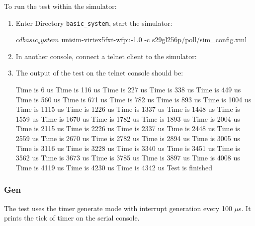 \noindent To run the test within the simulator:
\begin{enumerate}
\item Enter Directory \texttt{basic\_system}, start the simulator:
\begin{script}
$ cd basic_system
$ unisim-virtex5fxt-wfpu-1.0 -c s29gl256p/poll/sim_config.xml
\end{script}
\item In another console, connect a telnet client to the simulator:
\item The output of the test on the telnet console should be:
\begin{script}
Time is 6 us
Time is 116 us
Time is 227 us
Time is 338 us
Time is 449 us
Time is 560 us
Time is 671 us
Time is 782 us
Time is 893 us
Time is 1004 us
Time is 1115 us
Time is 1226 us
Time is 1337 us
Time is 1448 us
Time is 1559 us
Time is 1670 us
Time is 1782 us
Time is 1893 us
Time is 2004 us
Time is 2115 us
Time is 2226 us
Time is 2337 us
Time is 2448 us
Time is 2559 us
Time is 2670 us
Time is 2782 us
Time is 2894 us
Time is 3005 us
Time is 3116 us
Time is 3228 us
Time is 3340 us
Time is 3451 us
Time is 3562 us
Time is 3673 us
Time is 3785 us
Time is 3897 us
Time is 4008 us
Time is 4119 us                                                                                                                                                                                      
Time is 4230 us                                                                                                                                                                                      
Time is 4342 us                                                                                                                                                                                      
Test is finished                                                                                                                                                                                     \end{script}
\end{enumerate}

\subsubsection{Gen}

The test uses the timer generate mode with interrupt generation every 100 $\mu$s.
It prints the tick of timer on the serial console.

